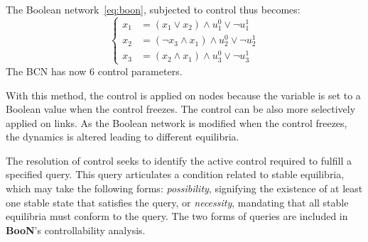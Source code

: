 \documentclass[numsec,webpdf,modern,large]{oup-authoring-template}
\newcommand{\boon}[0]{\textbf{BooN}\xspace}
\begin{document}
The Boolean network~\eqref{eq:boon}, subjected to control thus becomes:
\begin{equation}
	\left\{
	\begin{aligned}
		x_1 &=\left(x_1 \lor x_2\right) \land u^0_1 \lor \neg u^1_1 \\
		x_2 &=\left(\neg x_3\land x_1\right) \land u^0_2 \lor \neg u^1_2 \\
		x_3 &=\left(x_2\land x_1\right) \land u^0_3 \lor \neg u^1_3
	\end{aligned}\right.
	\label{eq:boonctrl}
\end{equation}
The BCN has now $6$ control parameters.

With this method, the control is applied on nodes because the variable is set to a Boolean value when the control freezes.
The control can be also more selectively applied on links\citep{biane2019}.
As the Boolean network is modified when the control freezes, the dynamics is altered leading to different equilibria.

The resolution of control seeks to identify the active control required to fulfill a specified query. This query articulates a condition related to stable equilibria, which may take the following forms:\emph{ possibility}, signifying the existence of at least one stable state that satisfies the query, or \emph{necessity}, mandating that all stable equilibria must conform to the query. The two forms of queries are included in \boon's controllability analysis. 
\end{document}

